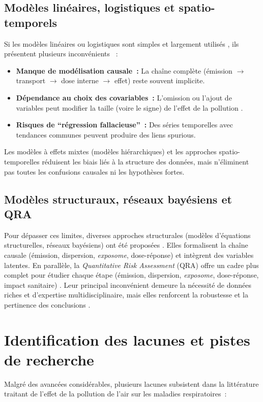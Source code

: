\subsection{Modèles linéaires, logistiques et spatio-temporels}
Si les modèles linéaires ou logistiques sont simples et largement utilisés \citep{Cui2003}, ils présentent plusieurs inconvénients \citep{Fewell2007,Jacobs1979,Christenfeld2004,Chen2006} :
\begin{itemize}
	\item \textbf{Manque de modélisation causale :} La chaîne complète (émission $\to$ transport $\to$ dose interne $\to$ effet) reste souvent implicite.
	\item \textbf{Dépendance au choix des covariables :} L’omission ou l’ajout de variables peut modifier la taille (voire le signe) de l’effet de la pollution \citep{Sneeringer2009}.
	\item \textbf{Risques de ``régression fallacieuse'' :} Des séries temporelles avec tendances communes peuvent produire des liens spurious.
\end{itemize}

Les modèles à effets mixtes (modèles hiérarchiques) \citep{Wakefield2009} et les approches spatio-temporelles réduisent les biais liés à la structure des données, mais n’éliminent pas toutes les confusions causales ni les hypothèses fortes.

\subsection{Modèles structuraux, réseaux bayésiens et QRA}
Pour dépasser ces limites, diverses approches structurales (modèles d’équations structurelles, réseaux bayésiens) ont été proposées \citep{Pearl2009,Shipley2000,Ellis2008}. Elles formalisent la chaîne causale (émission, dispersion, \emph{exposome}, dose-réponse) et intègrent des variables latentes. En parallèle, la \emph{Quantitative Risk Assessment} (QRA) offre un cadre plus complet pour étudier chaque étape (émission, dispersion, \emph{exposome}, dose-réponse, impact sanitaire) \citep{Greenland2002,Cox2005,Shih2006}. Leur principal inconvénient demeure la nécessité de données riches et d’expertise multidisciplinaire, mais elles renforcent la robustesse et la pertinence des conclusions \citep{Greenland2001,Lucas1976}.


\section{Identification des lacunes et pistes de recherche}
Malgré des avancées considérables, plusieurs lacunes subsistent dans la littérature traitant de l’effet de la pollution de l’air sur les maladies respiratoires :

